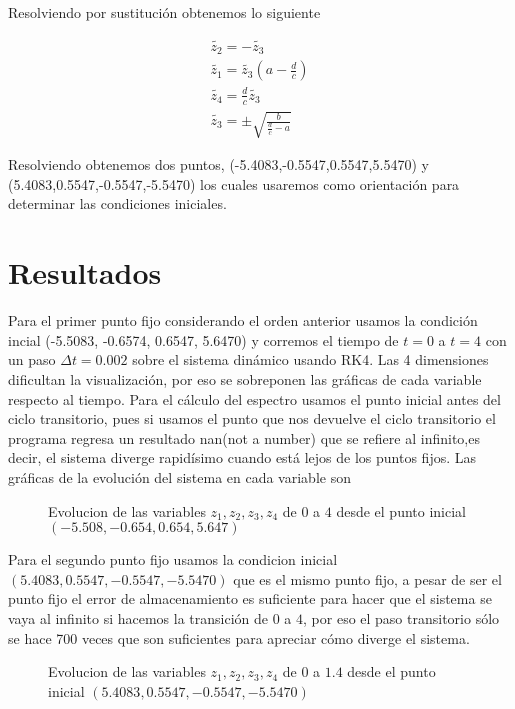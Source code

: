 \documentclass[10pt]{article}
\begin{document}
Resolviendo por sustituci\'on obtenemos lo siguiente

\begin{eqnarray} 
	\tilde{z_2} = -\tilde{z_3} \\
	\tilde{z_1} = \tilde{z_3} (a-\frac{d}{c}) \\
	\tilde{z_4} = \frac{d}{c} \tilde{z_3} \\
	\tilde{z_3} = \pm \sqrt{\frac{b}{\frac{d}{c} - a}}
\end{eqnarray}

Resolviendo obtenemos dos puntos, (-5.4083,-0.5547,0.5547,5.5470) 
y (5.4083,0.5547,-0.5547,-5.5470) los cuales usaremos como orientaci\'on para determinar las condiciones 
iniciales.

\section{Resultados}

Para el primer punto fijo considerando el orden anterior usamos la condici\'on 
incial (-5.5083, -0.6574, 0.6547, 5.6470) y corremos el tiempo de $t=0$ a $t=4$ con un paso 
$\Delta 
t=0.002$ sobre el sistema din\'amico usando RK4. Las 4 dimensiones dificultan la visualizaci\'on, 
por eso se sobreponen las gr\'aficas de cada variable respecto al tiempo. Para el c\'alculo del 
espectro usamos el punto inicial antes del ciclo transitorio, pues si usamos el punto que nos 
devuelve el ciclo transitorio el programa regresa un resultado nan(not a number) que se refiere al 
infinito,es decir, el sistema diverge rapid\'isimo cuando est\'a lejos de los puntos fijos. Las 
gr\'aficas de la evoluci\'on del sistema en cada variable son

\begin{figure}[H]
    \centering
    
    \caption{Evolucion de las variables $z_1 , z_2 , z_3 , z_4$ de $0$ a $4$ desde el punto 
			inicial $(-5.508, -0.654, 0.654, 5.647)$}
\end{figure}

Para el segundo punto fijo usamos la condicion inicial $(5.4083,0.5547, 
-0.5547,-5.5470)$ que es el mismo punto fijo, a pesar de ser el punto fijo 
el error de almacenamiento es suficiente para hacer que el sistema se vaya al infinito si hacemos 
la transici\'on de $0$ a $4$, por eso el paso transitorio s\'olo se hace 700 veces que son 
suficientes para apreciar c\'omo diverge el sistema. 

\begin{figure}[H]
    \centering
    
    \caption{Evolucion de las variables $z_1 , z_2 , z_3 , z_4$ de $0$ a $1.4$ desde el punto 
			inicial $(5.4083, 0.5547,-0.5547,-5.5470)$}
\end{figure}
\end{document}
